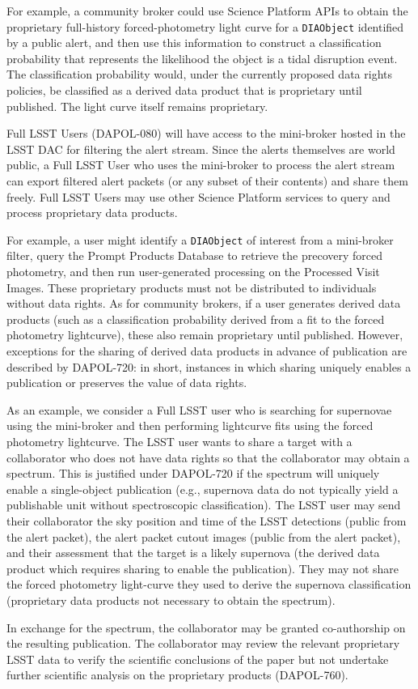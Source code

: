 For example, a community broker could use Science Platform APIs to obtain the proprietary full-history forced-photometry light curve for a \texttt{DIAObject} identified by a public alert,
and then use this information to construct a classification probability that represents the likelihood the object is a tidal disruption event.
The classification probability would, under the currently proposed data rights policies, be classified as a derived data product that is proprietary until published. The light curve itself remains proprietary.

Full LSST Users (DAPOL-080) will have access to the mini-broker hosted in the LSST DAC for filtering the alert stream.
Since the alerts themselves are world public, a Full LSST User who uses the mini-broker to process the alert stream can export filtered alert packets (or any subset of their contents) and share them freely.
Full LSST Users may use other Science Platform services to query and process proprietary data products.

For example, a user might identify a \texttt{DIAObject} of interest from a mini-broker filter, query the Prompt Products Database to retrieve the precovery forced photometry, and then run user-generated processing on the Processed Visit Images.
These proprietary products must not be distributed to individuals without data rights.
As for community brokers, if a user generates derived data products (such as a classification probability derived from a fit to the forced photometry lightcurve), these also remain proprietary until published.
However, exceptions for the sharing of derived data products in advance of publication are described by DAPOL-720: in short, instances in which sharing uniquely enables a publication or preserves the value of data rights.

As an example, we consider a Full LSST user who is searching for supernovae using the mini-broker and then performing lightcurve fits using the forced photometry lightcurve.
The LSST user wants to share a target with a collaborator who does not have data rights so that the collaborator may obtain a spectrum.
This is justified under DAPOL-720 if the spectrum will uniquely enable a single-object publication (e.g., supernova data do not typically yield a publishable unit without spectroscopic classification).
The LSST user may send their collaborator the sky position and time of the LSST detections (public from the alert packet), the alert packet cutout images (public from the alert packet), and their assessment that the target is a likely supernova (the derived data product which requires sharing to enable the publication).
They may not share the forced photometry light-curve they used to derive the supernova classification (proprietary data products not necessary to obtain the spectrum).

In exchange for the spectrum, the collaborator may be granted co-authorship on the resulting publication.
The collaborator may review the relevant proprietary LSST data to verify the scientific conclusions of the paper but not undertake further scientific analysis on the proprietary products (DAPOL-760).
